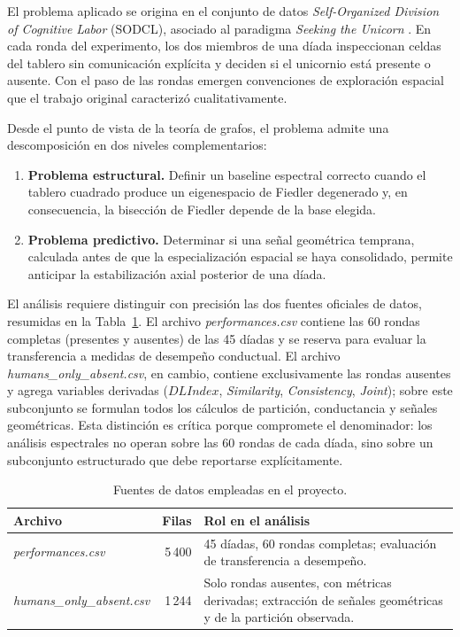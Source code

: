 \documentclass[journal]{IEEEtran}
\begin{document}
El problema aplicado se origina en el conjunto de datos \emph{Self-Organized Division of Cognitive Labor} (SODCL), asociado al paradigma \emph{Seeking the Unicorn} \cite{andrade2021}. En cada ronda del experimento, los dos miembros de una díada inspeccionan celdas del tablero sin comunicación explícita y deciden si el unicornio está presente o ausente. Con el paso de las rondas emergen convenciones de exploración espacial que el trabajo original caracterizó cualitativamente.

Desde el punto de vista de la teoría de grafos, el problema admite una descomposición en dos niveles complementarios:
\begin{enumerate}
\item \textbf{Problema estructural.} Definir un baseline espectral correcto cuando el tablero cuadrado produce un eigenespacio de Fiedler degenerado y, en consecuencia, la bisección de Fiedler depende de la base elegida.
\item \textbf{Problema predictivo.} Determinar si una señal geométrica temprana, calculada antes de que la especialización espacial se haya consolidado, permite anticipar la estabilización axial posterior de una díada.
\end{enumerate}

El análisis requiere distinguir con precisión las dos fuentes oficiales de datos, resumidas en la Tabla~\ref{tab:datasets}. El archivo \emph{performances.csv} contiene las 60 rondas completas (presentes y ausentes) de las 45 díadas y se reserva para evaluar la transferencia a medidas de desempeño conductual. El archivo \emph{humans\_only\_absent.csv}, en cambio, contiene exclusivamente las rondas ausentes y agrega variables derivadas ($DLIndex$, \emph{Similarity}, \emph{Consistency}, \emph{Joint}); sobre este subconjunto se formulan todos los cálculos de partición, conductancia y señales geométricas. Esta distinción es crítica porque compromete el denominador: los análisis espectrales no operan sobre las 60 rondas de cada díada, sino sobre un subconjunto estructurado que debe reportarse explícitamente.

\begin{table}[t]
\centering
\caption{Fuentes de datos empleadas en el proyecto.}
\label{tab:datasets}
\begin{tabular}{@{}lrp{}@{}}
\toprule
\textbf{Archivo} & \textbf{Filas} & \textbf{Rol en el análisis} \\
\midrule
\emph{performances.csv} & 5\,400 & 45 díadas, 60 rondas completas; evaluación de transferencia a desempeño. \\
\addlinespace
\emph{humans\_only\_absent.csv} & 1\,244 & Solo rondas ausentes, con métricas derivadas; extracción de señales geométricas y de la partición observada. \\
\bottomrule
\end{tabular}
\end{table}
\end{document}
